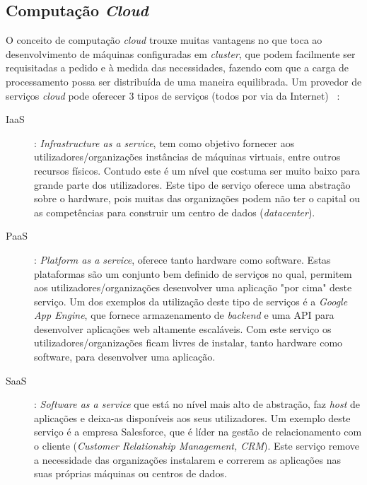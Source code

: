 \subsection{Computação \textit{Cloud}}
O conceito de computação \textit{cloud} trouxe muitas vantagens no que toca ao desenvolvimento de máquinas configuradas em \textit{cluster}, que podem facilmente ser requisitadas a pedido e à medida das necessidades, fazendo com que a carga de processamento possa ser distribuída de uma maneira equilibrada. Um provedor de serviços \textit{cloud} pode oferecer 3 tipos de serviços (todos por via da Internet) ~\cite{lin2010data}:
\begin{description}
    \item[IaaS]: \textit{Infrastructure as a service}, tem como objetivo fornecer aos utilizadores/organizações instâncias de máquinas virtuais, entre outros recursos físicos. Contudo este é um nível que costuma ser muito baixo para grande parte dos utilizadores. Este tipo de serviço oferece uma abstração sobre o hardware, pois muitas das organizações podem não ter o capital ou as competências para construir um centro de dados (\textit{datacenter}).
    
    \item[PaaS]: \textit{Platform as a service}, oferece tanto hardware como software. Estas plataformas são um conjunto bem definido de serviços no qual, permitem aos utilizadores/organizações desenvolver uma aplicação "por cima" \thinspace deste serviço. Um dos exemplos da utilização deste tipo de serviços é a \textit{Google App Engine}, que fornece armazenamento de \textit{backend} e uma API para desenvolver aplicações web altamente 
    escaláveis. Com este serviço os utilizadores/organizações ficam livres de instalar, tanto hardware como software, para desenvolver uma aplicação.
    
    \item[SaaS]: \textit{Software as a service} que está no nível mais alto de abstração, faz \textit{host} de aplicações e deixa-as disponíveis aos seus utilizadores. Um exemplo deste serviço é a empresa Salesforce, que é líder na gestão de relacionamento com o cliente (\textit{Customer Relationship Management, CRM}). Este serviço remove a necessidade das organizações instalarem e correrem as aplicações nas suas próprias máquinas ou centros de dados.
    
\end{description}
